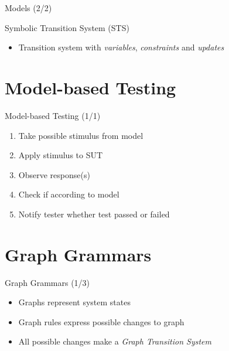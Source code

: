 \documentclass{FMTslides}
\begin{document}
\begin{frame}{Models (2/2)}
\begin{block}{Symbolic Transition System (STS)}
\begin{itemize}
  \item Transition system with \textit{variables}, \textit{constraints} and \textit{updates}
\end{itemize}
\end{block}
\begin{figure}

\end{figure}
\end{frame}

\section{Model-based Testing}

\begin{frame}{Model-based Testing (1/1)}
\begin{figure}

\end{figure}
\begin{enumerate}
\item Take possible stimulus from model
\item Apply stimulus to SUT
\item Observe response(s)
\item Check if according to model
\item Notify tester whether test passed or failed
\end{enumerate}
\end{frame}

\section{Graph Grammars}

\begin{frame}{Graph Grammars (1/3)}
\begin{figure}
\centering

\end{figure}

\begin{itemize}
  \item Graphs represent system states
  \item Graph rules express possible changes to graph
  \item All possible changes make a \textit{Graph Transition System}
\end{itemize}
\end{frame}
\end{document}
